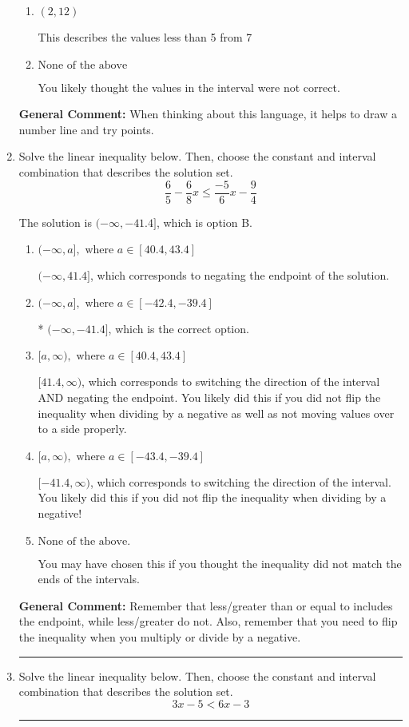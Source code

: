 \documentclass{extbook}[14pt]
\newcommand{\litem}[1]{\item #1

\rule{\textwidth}{0.4pt}}
\begin{document}
\begin{enumerate}
{\begin{enumerate}[label=\Alph*.]
This describes the values more than 5 from 7
\item \( (2, 12) \)

This describes the values less than 5 from 7
\item \( \text{None of the above} \)

You likely thought the values in the interval were not correct.
\end{enumerate}

\textbf{General Comment:} When thinking about this language, it helps to draw a number line and try points.
}
\litem{
Solve the linear inequality below. Then, choose the constant and interval combination that describes the solution set.
\[ \frac{6}{5} - \frac{6}{8} x \leq \frac{-5}{6} x - \frac{9}{4} \]

The solution is \( (-\infty, -41.4] \), which is option B.\begin{enumerate}[label=\Alph*.]
\item \( (-\infty, a], \text{ where } a \in [40.4, 43.4] \)

 $(-\infty, 41.4]$, which corresponds to negating the endpoint of the solution.
\item \( (-\infty, a], \text{ where } a \in [-42.4, -39.4] \)

* $(-\infty, -41.4]$, which is the correct option.
\item \( [a, \infty), \text{ where } a \in [40.4, 43.4] \)

 $[41.4, \infty)$, which corresponds to switching the direction of the interval AND negating the endpoint. You likely did this if you did not flip the inequality when dividing by a negative as well as not moving values over to a side properly.
\item \( [a, \infty), \text{ where } a \in [-43.4, -39.4] \)

 $[-41.4, \infty)$, which corresponds to switching the direction of the interval. You likely did this if you did not flip the inequality when dividing by a negative!
\item \( \text{None of the above}. \)

You may have chosen this if you thought the inequality did not match the ends of the intervals.
\end{enumerate}

\textbf{General Comment:} Remember that less/greater than or equal to includes the endpoint, while less/greater do not. Also, remember that you need to flip the inequality when you multiply or divide by a negative.
}
\litem{
Solve the linear inequality below. Then, choose the constant and interval combination that describes the solution set.
\[ 3x -5 < 6x -3 \]

}
\end{enumerate}
\end{document}
